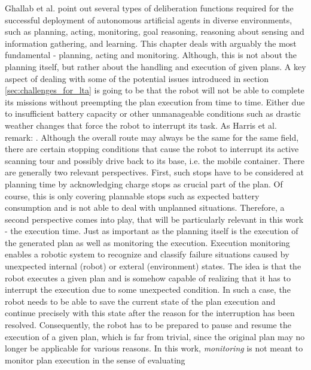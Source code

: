 \documentclass[english, master, utf8]{base/thesis_KBS}
\begin{document}
Ghallab et al. point out several types of deliberation functions required for the successful deployment of autonomous artificial agents in diverse environments,
such as planning, acting, monitoring, goal reasoning, reasoning about sensing and information gathering, and learning. \cite{GNT:2016} This chapter deals with arguably the most
fundamental - planning, acting and monitoring. Although, this is not about the planning itself, but rather about the handling and execution of given plans.
A key aspect of dealing with some of the potential issues introduced in section \ref{sec:challenges_for_lta} is going to be that the robot will not be able to
complete its missions without preempting the plan execution from time to time. Either due to insufficient battery capacity or other unmanageable conditions such as 
drastic weather changes that force the robot to interrupt its task. As Harris et al. remark: . \cite{Harris:2021} Although the overall route may always be the same for the same field, there are certain stopping
conditions that cause the robot to interrupt its active scanning tour and possibly drive back to its base, i.e. the mobile container.
There are generally two relevant perspectives. First, such stops have to be considered at planning time by acknowledging charge stops as crucial part of the plan.
Of course, this is only covering plannable stops such as expected battery consumption and is not able to deal with unplanned situations.
Therefore, a second perspective comes into play, that will be particularly relevant in this work - the execution time.
Just as important as the planning itself is the execution of the generated plan as well as monitoring the execution. Execution monitoring enables a robotic system to
recognize and classify failure situations caused by unexpected internal (robot) or exteral (environment) states. \cite{Pettersson:2005}
The idea is that the robot executes a given plan and is somehow capable of realizing that it has to interrupt the execution due to some unexpected condition.
In such a case, the robot needs to be able to save the current state of the plan execution and continue precisely with this state after the reason 
for the interruption has been resolved. Consequently, the robot has to be prepared to pause and resume the execution of a given plan, which is far from 
trivial, since the original plan may no longer be applicable for various reasons. In this work, \textit{monitoring} is not meant to monitor plan execution in the sense of evaluating
\end{document}
